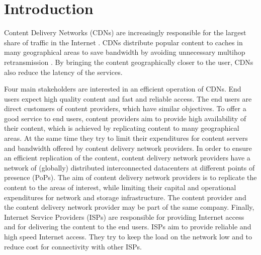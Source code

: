 \chapter{Introduction}\label{chap:introduction}

Content Delivery Networks (CDNs) are increasingly responsible for the largest share of traffic in the Internet \cite{cisco2016}.
CDNs distribute popular content to caches in many geographical areas to save bandwidth by avoiding unnecessary multihop retransmission \cite{paschos2016wireless}.
By bringing the content geographically closer to the user, CDNs also reduce the latency of the services.

Four main stakeholders are interested in an efficient operation of CDNs.
End users expect high quality content and fast and reliable access.
The end users are direct customers of content providers, which have similar objectives.
To offer a good service to end users, content providers aim to provide high availability of their content, which is achieved by replicating content to many geographical areas.
At the same time they try to limit their expenditures for content servers and bandwidth offered by content delivery network providers.
In order to ensure an efficient replication of the content, content delivery network providers have a network of (globally) distributed interconnected datacenters at different points of presence (PoPs).
The aim of content delivery network providers is to replicate the content to the areas of interest, while limiting their capital and operational expenditures for network and storage infrastructure.
The content provider and the content delivery network provider may be part of the same company.
Finally, Internet Service Providers (ISPs) are responsible for providing Internet access and for delivering the content to the end users.
ISPs aim to provide reliable and high speed Internet access.
They try to keep the load on the network low and to reduce cost for connectivity with other ISPs.


